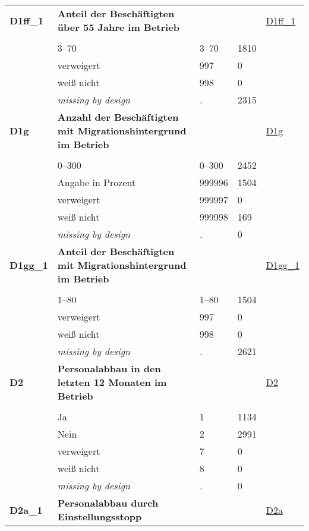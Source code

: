 \begin{longtable}{| L{2.65cm} | L{8cm} | C{1.5cm} | R{1.25cm} | C{2.25cm}  |}
\textbf{D1ff\_1}\label{var:D1ff:1} & \textbf{Anteil der Beschäftigten über 55 Jahre im Betrieb} &  &  & \hyperref[D1ff:1]{D1ff\_1} \\ 
   &  &  &  &  \\ 
   & 3--70 & 3--70 & 1810 &  \\ 
   & verweigert & 997 & 0 &  \\ 
   & weiß nicht & 998 & 0 &  \\ 
   & \textit{missing by design} & \textit{.} & 2315 &  \\ 
   \midrule
\textbf{D1g}\label{var:D1g} & \textbf{Anzahl der Beschäftigten mit Migrationshintergrund im Betrieb} &  &  & \hyperref[D1g]{D1g} \\ 
   &  &  &  &  \\ 
   & 0--300 & 0--300 & 2452 &  \\ 
   & Angabe in Prozent & 999996 & 1504 &  \\ 
   & verweigert & 999997 & 0 &  \\ 
   & weiß nicht & 999998 & 169 &  \\ 
   & \textit{missing by design} & \textit{.} & 0 &  \\ 
   \midrule
\textbf{D1gg\_1}\label{var:D1gg:1} & \textbf{Anteil der Beschäftigten mit Migrationshintergrund im Betrieb} &  &  & \hyperref[D1gg:1]{D1gg\_1} \\ 
   &  &  &  &  \\ 
   & 1--80 & 1--80 & 1504 &  \\ 
   & verweigert & 997 & 0 &  \\ 
   & weiß nicht & 998 & 0 &  \\ 
   & \textit{missing by design} & \textit{.} & 2621 &  \\ 
   \midrule
\textbf{D2}\label{var:D2} & \textbf{Personalabbau in den letzten 12 Monaten im Betrieb} &  &  & \hyperref[D2]{D2} \\ 
   &  &  &  &  \\ 
   & Ja & 1 & 1134 &  \\ 
   & Nein & 2 & 2991 &  \\ 
   & verweigert & 7 & 0 &  \\ 
   & weiß nicht & 8 & 0 &  \\ 
   & \textit{missing by design} & \textit{.} & 0 &  \\ 
   \midrule
\textbf{D2a\_1}\label{var:D2a:1} & \textbf{Personalabbau durch Einstellungsstopp} &  &  & \hyperref[D2a]{D2a} \\ 

\end{longtable}
